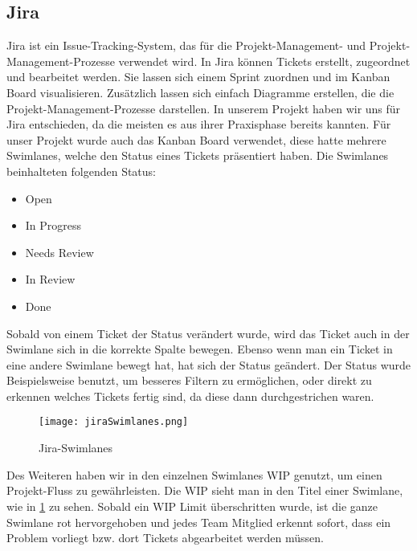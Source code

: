 \subsection{Jira}
    Jira ist ein Issue-Tracking-System, das für die Projekt-Management- und Projekt-Management-Prozesse verwendet wird.
    In Jira können Tickets erstellt, zugeordnet und bearbeitet werden. Sie lassen sich einem Sprint zuordnen und im Kanban Board visualisieren.
    Zusätzlich lassen sich einfach Diagramme erstellen, die die Projekt-Management-Prozesse darstellen.
    In unserem Projekt haben wir uns für Jira entschieden, da die meisten es aus ihrer Praxisphase bereits kannten.
    Für unser Projekt wurde auch das Kanban Board verwendet, diese hatte mehrere Swimlanes, welche den Status eines Tickets präsentiert haben.
    Die Swimlanes beinhalteten folgenden Status:
    \begin{itemize}
        \item Open
        \item In Progress
        \item Needs Review
        \item In Review
        \item Done
    \end{itemize}
    Sobald von einem Ticket der Status verändert wurde, wird das Ticket auch in der Swimlane sich in die korrekte Spalte bewegen. Ebenso wenn man ein Ticket in eine andere Swimlane bewegt hat, hat sich der Status geändert.
    Der Status wurde Beispielsweise benutzt, um besseres Filtern zu ermöglichen, oder direkt zu erkennen welches Tickets fertig sind, da diese dann durchgestrichen waren.
    \begin{figure}[!hbt]
        \texttt{[image: jiraSwimlanes.png]}
        \caption{Jira-Swimlanes}
        \label{fig:Jira-Swimlanes}
    \end{figure}  
    Des Weiteren haben wir in den einzelnen Swimlanes \ac{WIP} genutzt, um einen Projekt-Fluss zu gewährleisten. Die \ac{WIP} sieht man in den Titel einer Swimlane, wie in \ref{fig:Jira-Swimlanes} zu sehen.
    Sobald ein \ac{WIP} Limit überschritten wurde, ist die ganze Swimlane rot hervorgehoben und jedes Team Mitglied erkennt sofort, dass ein Problem vorliegt bzw. dort Tickets abgearbeitet werden müssen.
